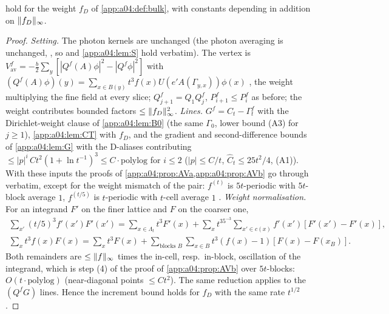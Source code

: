 \begin{proposition}\label{app:a04:prop:AVf}
 hold for the weight $f_D$ of \cref{app:a04:def:bulk}, with constants depending in addition on $\lVert f_D\rVert_\infty$.
\end{proposition}
\begin{proof}
\emph{Setting.} The photon kernels are unchanged (the photon averaging is unchanged, \cite[p.~328]{K2}, so \cite[(2.17)]{K1} and \cref{app:a04:lem:S} hold verbatim). The vertex is $V^f_{\mathrm{av}}=-\frac b2\sum_y[|Q^f(A)\phi|^2-|Q^f\phi|^2]$ with $(Q^f(A)\phi)(y)=\sum_{x\in B(y)}t^3f(x)U(e'A(\Gamma_{y,x}))\phi(x)$ \cite[(3.2)]{K2}, the weight multiplying the fine field at every slice; $Q^f_{j+1}=Q_1Q^f_j$, $P^f_{i+1}\le P^f_i$ as before; the weight contributes bounded factors $\le\lVert f_D\rVert_\infty^2$. \emph{Lines.} $G^f=C_t-\Gamma^f_t$ with the Dirichlet-weight clause of \cref{app:a04:lem:B0} (the same $\Gamma_0$, lower bound (A3) for $j\ge1$), \cref{app:a04:lem:CT} with $f_D$, and the gradient and second-difference bounds of \cref{app:a04:lem:G} with the D-aliases contributing $\le|p|^i\,Ct^2(1+\ln t^{-1})^3\le C\cdot\mathrm{polylog}$ for $i\le2$ ($|p|\le C/t$, $\hat C_t\le25t^2/4$, (A1)). With these inputs the proofs of \cref{app:a04:prop:AVa,app:a04:prop:AVb} go through verbatim, except for the weight mismatch of the pair: $f^{(t)}$ is $5t$-periodic with $5t$-block average $1$, $f^{(t/5)}$ is $t$-periodic with $t$-cell average $1$ \cite[(3.1)]{K2}. \emph{Weight normalisation.} For an integrand $F'$ on the finer lattice and $F$ on the coarser one,
\begin{gather*}
\textstyle\sum_{x'}(t/5)^3f'(x')F'(x')=\sum_{x\in\Lambda_t}t^3F'(x)+\sum_xt^35^{-3}\sum_{x'\in c(x)}f'(x')[F'(x')-F'(x)],\\
\textstyle\sum_xt^3f(x)F(x)=\sum_xt^3F(x)+\sum_{\text{blocks }B}\sum_{x\in B}t^3(f(x)-1)[F(x)-F(x_B)].
\end{gather*}
Both remainders are $\le\lVert f\rVert_\infty$ times the in-cell, resp.\ in-block, oscillation of the integrand, which is step (4) of the proof of \cref{app:a04:prop:AVb} over $5t$-blocks: $O(t\cdot\mathrm{polylog})$ (near-diagonal points $\le Ct^2$). The same reduction applies to the $(Q^fG)$ lines. Hence the increment bound holds for $f_D$ with the same rate $t^{1/2}$.
\end{proof}


